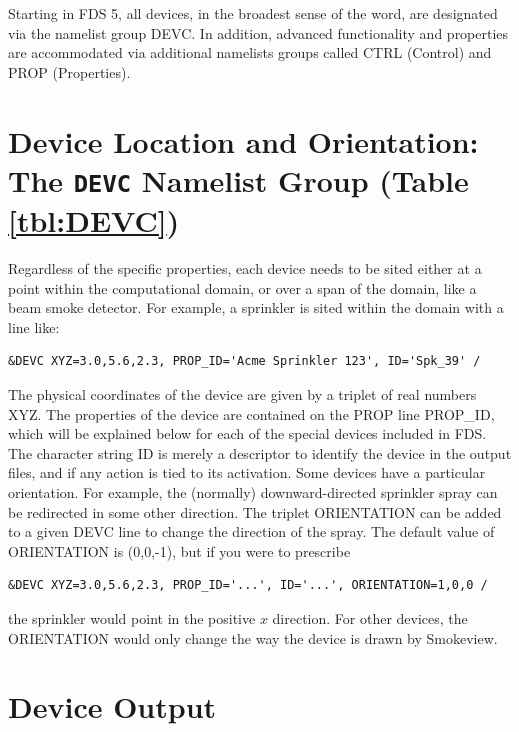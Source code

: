 \documentclass[11pt]{book}
\begin{document}
Starting in FDS 5, all devices, in the broadest sense of the word, are designated via the namelist group {\ct DEVC}.
In addition, advanced functionality and properties are accommodated via additional namelists groups called {\ct CTRL} (Control) and
{\ct PROP} (Properties).




\section{Device Location and Orientation: The \texorpdfstring{{\tt DEVC}}{DEVC} Namelist Group (Table \ref{tbl:DEVC})}
\label{info:DEVC}

Regardless of the specific properties, each device needs to be sited either at a point within the computational domain, or
over a span of the domain, like a beam smoke detector. For example, a sprinkler is sited within the domain with a line like:

\footnotesize
\begin{verbatim}
&DEVC XYZ=3.0,5.6,2.3, PROP_ID='Acme Sprinkler 123', ID='Spk_39' /
\end{verbatim}
\normalsize

\noindent
The physical coordinates of the
device are given by a triplet of real numbers {\ct XYZ}.
The properties of the device are contained on the {\ct PROP} line {\ct PROP\_ID}, which will be explained below for each of the
special devices included in FDS.
The character string {\ct ID} is merely a descriptor to identify the
device in the output files, and if any action is tied to its activation.
Some devices have a particular orientation. For example, the (normally) downward-directed sprinkler
spray can be redirected in some other direction. The triplet
{\ct ORIENTATION} can be added to a given {\ct DEVC} line to change the direction of the spray.
The default value of {\ct ORIENTATION} is (0,0,-1), but if you were
to prescribe

\footnotesize
\begin{verbatim}
&DEVC XYZ=3.0,5.6,2.3, PROP_ID='...', ID='...', ORIENTATION=1,0,0 /
\end{verbatim}
\normalsize

\noindent
the sprinkler would point in the positive $x$ direction.
For other devices, the {\ct ORIENTATION} would only change the way the device is drawn by Smokeview.



\section{Device Output}
\label{info:out:DEVC}
\end{document}
